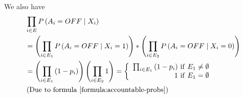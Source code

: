 \documentclass{article}
\numberwithin{equation}{section}
\numberwithin{figure}{section}
\numberwithin{table}{section}
\begin{document}
We also have
\begin{align*}
&\prod_{i\in E}{P\left(A_i=OFF\mathrel{\left|\vphantom{A_i=OFF X_i}\right.\kern-\nulldelimiterspace}X_i\right)}\\
&=\left(\prod_{i\in E_1}{P\left(A_i=OFF\mathrel{\left|\vphantom{A_i=OFF X_i=1}\right.\kern-\nulldelimiterspace}X_i=1\right)}\right)*\left(\prod_{i\in E_2}{P\left(A_i=OFF\mathrel{\left|\vphantom{A_i=OFF X_i=0}\right.\kern-\nulldelimiterspace}X_i=0\right)}\right)\\
&=\left(\prod_{i\in E_1}{\left(1-p_i\right)}\right)\left(\prod_{i\in E_2}{1}\right)=\left\{ \begin{array}{r}
\prod_{i\in E_1}{\left(1-p_i\right)}\ \mathrm{if}\ E_1\neq \emptyset  \\ 
1\ \mathrm{if}\ E_1=\emptyset  \end{array}
\right.\\
&\left(\mathrm{Due\ to\ formula~\ref{formula:accountable-probs}}\right)
\end{align*}
\end{document}

